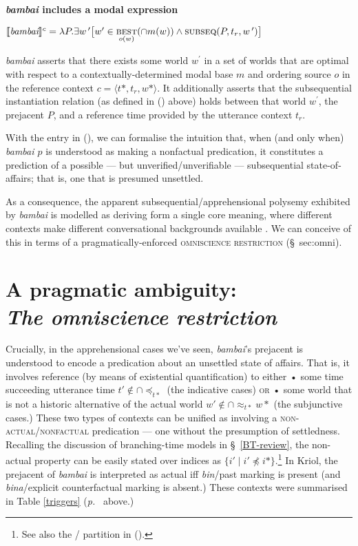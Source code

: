 \pex \textbf{\textit{bambai} includes a modal expression}

$\denote[c]{\textit{bambai}}=\lambda P.\exists w\,^\prime\big[w'\in\underset{o(w)}{\textsc{best}}(\cap m(w))\wedge\text{{\sc subseq}}(P,t_r,w\,^\prime)\big]$

\textit{bambai} asserts that there exists some world $w^\prime$ in a set of worlds that are optimal with respect to a contextually-determined modal base $m$ and ordering source $o$ in the reference context $c=\langle t*,t_r,w*\rangle$. It additionally asserts that the {\sc subsequential instantiation} relation (as defined in () above) holds between that world $w^\prime$, the prejacent $P$, and a reference time provided by the utterance context $t_r$.

\xe


With the entry in (\lastx), we can formalise the intuition that, when (and only when) \textit{bambai $p$} is understood as making a nonfactual predication, it constitutes a prediction of a possible --- but unverified/unverifiable --- subsequential state-of-affairs; that is, one that is presumed unsettled. 


As a consequence, the apparent subsequential/apprehensional polysemy exhibited by \textit{bambai} is modelled as deriving form a single core meaning, where different contexts make different conversational backgrounds available \citep[\textit{cf.}][55\textit{ff}]{Kratzer2012}. We can conceive of this in terms of a pragmatically-enforced \textsc{omniscience restriction} (\S~sec:omni).


\section[The omniscience restriction]{A pragmatic ambiguity:\\\it The omniscience restriction}\label{sec:omni}


 Crucially, in the apprehensional cases we've seen, \textit{bambai}'s prejacent is understood to encode a predication about an unsettled state of affairs. That is, it involves reference (by means of existential quantification) to either • some time  succeeding utterance time $ t'\notin\cap{\preccurlyeq_{t*}} $ (the indicative cases) \textsc{or} • some world that is not a historic alternative of the actual world $w'\notin\cap{\approx_{t*}}w* $ (the subjunctive cases.) These two types of contexts can be unified as involving a \textsc{non-actual}/\textsc{nonfactual} predication --- one without the presumption of settledness. Recalling the discussion of branching-time models in \S~\ref{BT-review}, the non-actual property can be easily stated over indices as $ \{i'\mid i'\not\preccurlyeq i*\} $.\footnote{See also the \citeauthor{Rumberg2016a}/\citeauthor{VonPrince2019} partition in ().} In Kriol, the prejacent of \textit{bambai} is interpreted as actual if{f} \textit{bin}/past marking is present (and \textit{bina}/explicit counterfactual marking is absent.) These contexts were summarised in Table \ref{triggers} (\textit{p.}~\pageref{triggers} above.)
 
